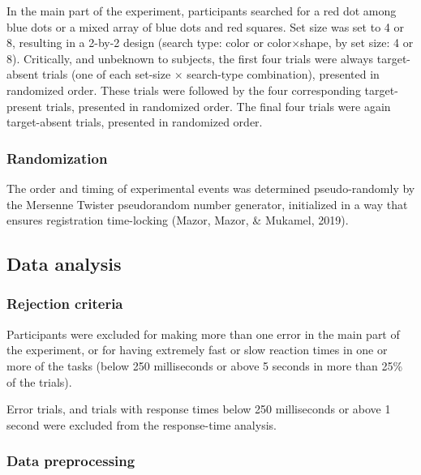 \documentclass[12pt,twoside]{reedthesis}
\begin{document}
\begin{figure}
\end{figure}
In the main part of the experiment, participants searched for a red dot among blue dots or a mixed array of blue dots and red squares. Set size was set to 4 or 8, resulting in a 2-by-2 design (search type: color or color\(\times\)shape, by set size: 4 or 8). Critically, and unbeknown to subjects, the first four trials were always target-absent trials (one of each set-size \(\times\) search-type combination), presented in randomized order. These trials were followed by the four corresponding target-present trials, presented in randomized order. The final four trials were again target-absent trials, presented in randomized order.

\hypertarget{randomization}{%
\subsubsection*{Randomization}\label{randomization}}

The order and timing of experimental events was determined pseudo-randomly by the Mersenne Twister pseudorandom number generator, initialized in a way that ensures registration time-locking (Mazor, Mazor, \& Mukamel, 2019).

\hypertarget{data-analysis}{%
\subsection{Data analysis}\label{data-analysis}}

\hypertarget{rejection-criteria}{%
\subsubsection*{Rejection criteria}\label{rejection-criteria}}

Participants were excluded for making more than one error in the main part of the experiment, or for having extremely fast or slow reaction times in one or more of the tasks (below 250 milliseconds or above 5 seconds in more than 25\% of the trials).

Error trials, and trials with response times below 250 milliseconds or above 1 second were excluded from the response-time analysis.

\hypertarget{data-preprocessing}{%
\subsubsection*{Data preprocessing}\label{data-preprocessing}}
\end{document}
